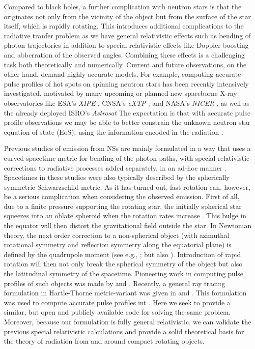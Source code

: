 \documentclass[iop, usenatbib]{emulateapj}
\newcommand{\sch}{Schwarzschild }
\begin{document}
Compared to black holes, a further complication with neutron stars is that the originates not only from the vicinity of the object but from the surface of the star itself, which is rapidly rotating.
This introduces additional complications to the radiative tranfer problem as we have general relativistic effects such as bending of photon trajectories in addition to special relativistic effects like Doppler boosting and abberration of the observed angles.
Combining these effects is a challenging task both theoretically and numerically.
Current and future observations, on the other hand, demand highly accurate models.
For example, computing accurate pulse profiles of hot spots on spinning neutron stars has been recently intensively investigated, motivated by many upcoming or planned new spaceborne X-ray observatories like ESA's \textit{XIPE} \citep{XIPE}, CNSA's \textit{eXTP} \citep{eXTP}, and NASA's \textit{NICER} \citep{NICER}, as well as the already deployed ISRO's \textit{Astrosat} \citep{Astrosat}
The expectation is that with accurate pulse profile observations we may be able to better constrain the unknown neutron star equation of state (EoS), using the information encoded in the radiation \citep[see e.g.,][]{LMB13}.

Previous studies of emission from NSs are mainly formulated in a way that uses a curved spacetime metric for bending of the photon paths, with special relativistic corrections to radiative processes added separately, in an ad-hoc manner \citep[see e.g.,][]{PFC83, P95, WM01, PB06}. %
Spacetimes in these studies were also typically described by the spherically symmetric \sch metric.
As it has turned out, fast rotation can, however, be a serious complication when considering the observed emission.
First of all, due to a finite pressure supporting the rotating star, the initially spherical star squeezes into an oblate spheroid when the rotation rates increase \citep[see e.g.,][]{CST94, MLC07, aGM14}.
This bulge in the equator will then distort the gravitational field outside the star.
In Newtonian theory, the next order correction to a non-spherical object (with azimuthal rotational symmetry and reflection symmetry along the equatorial plane) is defined by the quadrupole moment (see e.g., \citealt{LP99}; but also \citealt{PA12}).
Introduction of rapid rotation will then not only break the spherical symmetry of the object but also the latitudinal symmetry of the spacetime.
Pioneering work in computing pulse profiles of such objects was made by \citet{CL05} and \citet{CML07}.
Recently, a general ray tracing formulation in Hartle-Thorne metric-variant was given in \citet{PJ12} and \citet{BPO12}. This formulation was used to compute accurate pulse profiles int \citet{PO14}.
Here we seek to provide a similar, but open and publicly available code for solving the same problem.
Moreover, because our formulation is fully general relativistic, we can validate the previous special relativistic calculations and provide a solid theoretical basis for the theory of radiation from and around compact rotating objects.
\end{document}
